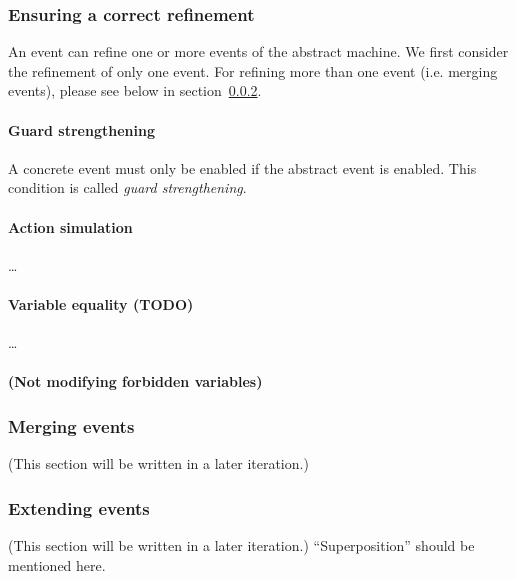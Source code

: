 \subsubsection{Ensuring a correct refinement}
\label{refinement_proof_obligations}
An event can refine one or more events of the abstract machine.
We first consider the refinement of only one event. 
For refining more than one event (i.e. merging events), please see below in section~\ref{merging_events}.

\paragraph{Guard strengthening}
A concrete event must only be enabled if the abstract event is enabled.
This condition is called \emph{guard strengthening}.


\paragraph{Action simulation} \ldots
{}

\paragraph{Variable equality (TODO)} \ldots

\paragraph{(Not modifying forbidden variables)}


\subsubsection{Merging events}
\label{merging_events}
(This section will be written in a later iteration.)

\subsubsection{Extending events}
\label{extending_events}
(This section will be written in a later iteration.)
``Superposition'' should be mentioned here.


